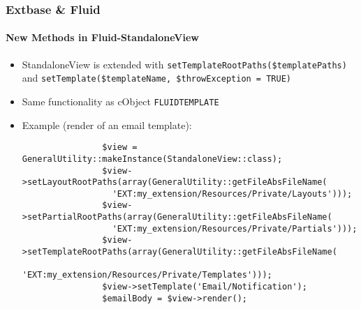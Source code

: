\begin{frame}[fragile]
	\frametitle{Extbase \& Fluid}
	\framesubtitle{New Methods in Fluid-StandaloneView}

	\lstset{basicstyle=\tiny\ttfamily}

	\begin{itemize}

		\item StandaloneView is extended with
			\texttt{setTemplateRootPaths(\$templatePaths)} and
			\texttt{setTemplate(\$templateName, \$throwException = TRUE)}

		\item Same functionality as cObject \texttt{FLUIDTEMPLATE}

		\item Example (render of an email template):

			\begin{lstlisting}
				$view = GeneralUtility::makeInstance(StandaloneView::class);
				$view->setLayoutRootPaths(array(GeneralUtility::getFileAbsFileName(
				  'EXT:my_extension/Resources/Private/Layouts')));
				$view->setPartialRootPaths(array(GeneralUtility::getFileAbsFileName(
				  'EXT:my_extension/Resources/Private/Partials')));
				$view->setTemplateRootPaths(array(GeneralUtility::getFileAbsFileName(
				  'EXT:my_extension/Resources/Private/Templates')));
				$view->setTemplate('Email/Notification');
				$emailBody = $view->render();
			\end{lstlisting}

	\end{itemize}

\end{frame}


